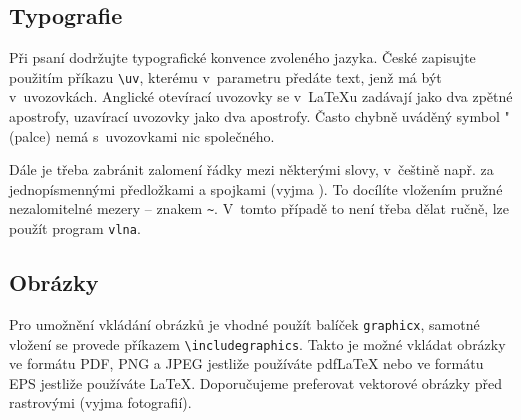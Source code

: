 \documentclass[thesis=B,czech]{FITthesis}[2011/06/14]
\begin{document}
% 
% 
% 
% 
 
 \subsection{Typografie}
 
 Při psaní dodržujte typografické konvence zvoleného jazyka. České  zapisujte použitím příkazu \verb|\uv|, kterému v~parametru předáte text, jenž má být v~uvozovkách. Anglické otevírací uvozovky se v~\LaTeX{}u zadávají jako dva zpětné apostrofy, uzavírací uvozovky jako dva apostrofy. Často chybně uváděný symbol "{} (palce) nemá s~uvozovkami nic společného.
 
 Dále je třeba zabránit zalomení řádky mezi některými slovy, v~češtině např. za jednopísmennými předložkami a spojkami (vyjma ). To docílíte vložením pružné nezalomitelné mezery -- znakem \texttt{\textasciitilde}. V~tomto případě to není třeba dělat ručně, lze použít program \verb|vlna|.
 
 
 \subsection{Obrázky}
 
 Pro umožnění vkládání obrázků je vhodné použít balíček \verb|graphicx|, samotné vložení se provede příkazem \verb|\includegraphics|. Takto je možné vkládat obrázky ve formátu PDF, PNG a JPEG jestliže používáte pdf\LaTeX{} nebo ve formátu EPS jestliže používáte \LaTeX{}. Doporučujeme preferovat vektorové obrázky před rastrovými (vyjma fotografií).
 
\end{document}
